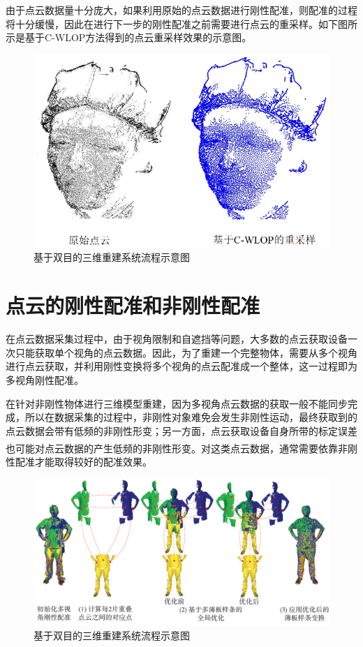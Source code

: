 \documentclass[10pt]{article}
\newcommand{\upcite}[1]{\textsuperscript{\textsuperscript{\cite{#1}}}}
\begin{document}
由于点云数据量十分庞大，如果利用原始的点云数据进行刚性配准，则配准的过程将十分缓慢，因此在进行下一步的刚性配准之前需要进行点云的重采样。如下图所示是基于C-WLOP方法得到的点云重采样效果的示意图。
\begin{figure}[H]
\begin{center}
\includegraphics[scale=0.25]{point-cloud-resampling.png}
\caption{基于双目的三维重建系统流程示意图}
\end{center}
\end{figure}

\section{点云的刚性配准和非刚性配准}
在点云数据采集过程中，由于视角限制和自遮挡等问题，大多数的点云获取设备一次只能获取单个视角的点云数据。因此，为了重建一个完整物体，需要从多个视角进行点云获取，并利用刚性变换将多个视角的点云配准成一个整体，这一过程即为多视角刚性配准。
\par 在针对非刚性物体进行三维模型重建，因为多视角点云数据的获取一般不能同步完成，所以在数据采集的过程中，非刚性对象难免会发生非刚性运动，最终获取到的点云数据会带有低频的非刚性形变；另一方面，点云获取设备自身所带的标定误差也可能对点云数据的产生低频的非刚性形变\upcite{non_rigid_register01}。对这类点云数据，通常需要依靠非刚性配准才能取得较好的配准效果。
\begin{figure}[H]
\begin{center}
\includegraphics[scale=0.25]{non-rigid-registration.png}
\caption{基于双目的三维重建系统流程示意图}
\end{center}
\end{figure}
\end{document}
